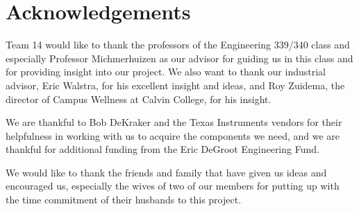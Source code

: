 \documentclass[ppfs.tex]{template/subfiles}
\begin{document}
\section{Acknowledgements}

Team 14 would like to thank the professors of the Engineering 339/340 class and especially Professor Michmerhuizen as our advisor for guiding us in this class and for providing insight into our project. We also want to thank our industrial advisor, Eric Walstra, for his excellent insight and ideas, and Roy Zuidema, the director of Campus Wellness at Calvin College, for his insight.

We are thankful to Bob DeKraker and the Texas Instruments vendors for their helpfulness in working with us to acquire the components we need, and we are thankful for additional funding from the Eric DeGroot Engineering Fund.

We would like to thank the friends and family that have given us ideas and encouraged us, especially the wives of two of our members for putting up with the time commitment of their husbands to this project.
\end{document}
